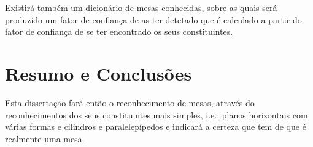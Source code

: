 Existirá também um dicionário de mesas conhecidas, sobre as quais será produzido um fator de confiança de as ter detetado que é calculado a partir do fator de confiança de se ter encontrado os seus constituintes.



\section{Resumo e Conclusões}

Esta dissertação fará então o reconhecimento de mesas, através do reconhecimentos dos seus constituintes mais simples, i.e.: planos horizontais com várias formas e cilindros e paralelepípedos e indicará a certeza que tem
de que é realmente uma mesa.